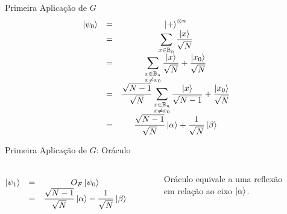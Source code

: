 \documentclass[12pt]{beamer}
\begin{document}
    \begin{frame}{Primeira Aplicação de $G$}
        \[
        \begin{matrix}
            \ket{\psi_0} &=& \ket{+}^{\otimes n} \\
            &=& \displaystyle\sum_{x \in \mathbb{B}_n} \dfrac{\ket{x}}{\sqrt{N}} \\
            &=& \displaystyle\sum_{\substack{x \in \mathbb{B}_n \\ x \ne x_0}}\dfrac{\ket{x}}{\sqrt{N}} + \dfrac{\ket{x_0}}{\sqrt{N}} \\
            &=& \dfrac{\sqrt{N - 1}}{\sqrt{N}}\displaystyle\sum_{\substack{x \in \mathbb{B}_n \\ x \ne x_0}}\dfrac{\ket{x}}{\sqrt{N - 1}} + \dfrac{\ket{x_0}}{\sqrt{N}} \\
            &=& \dfrac{\sqrt{N - 1}}{\sqrt{N}} \ket{\alpha} + \dfrac{1}{\sqrt{N}} \ket{\beta}
        \end{matrix}
        \]
    \end{frame}

    \begin{frame}{Primeira Aplicação de $G$: Oráculo}
        \begin{columns}
        \[
        \begin{matrix}
            \ket{\psi_1} &=& O_F \ket{\psi_0} \\
            &=& \dfrac{\sqrt{N - 1}}{\sqrt{N}} \ket{\alpha} - \dfrac{1}{\sqrt{N}} \ket{\beta}
        \end{matrix}
        \]

        \begin{figure}
            
            \caption{Oráculo equivale a uma reflexão em relação ao eixo $\ket{\alpha}$.}
            \label{fig:oracle}
        \end{figure}
        \end{columns}
    \end{frame}
\end{document}
